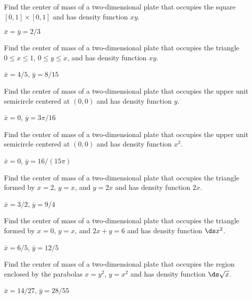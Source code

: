 \begin{enumialphparenastyle}

\begin{ex}
Find the center of mass of a two-dimensional plate 
that occupies the square $[0,1]\times[0,1]$
and has density
function $xy$.
\begin{sol}
$\bar x=\bar y=2/3$
\end{sol}
\end{ex}

\begin{ex}
Find the center of mass of a two-dimensional plate 
that occupies the triangle $0\le x\le1$, $0\le y\le x$,
and has density
function $xy$.
\begin{sol}
$\bar x=4/5$, $\bar y=8/15$
\end{sol}
\end{ex}

\begin{ex}
Find the center of mass of a two-dimensional plate 
that occupies the upper unit semicircle centered at $(0,0)$
and has density
function $y$.
\begin{sol}
$\bar x=0$, $\bar y=3\pi/16$
\end{sol}
\end{ex}

\begin{ex}
Find the center of mass of a two-dimensional plate 
that occupies the upper unit semicircle centered at $(0,0)$
and has density
function $x^2$.
\begin{sol}
$\bar x=0$, $\bar y=16/(15\pi)$
\end{sol}
\end{ex}

\begin{ex}
Find the center of mass of a two-dimensional plate 
that occupies the triangle formed by $x=2$, $y=x$, and $y=2x$
and has density
function $2x$.
\begin{sol}
$\bar x=3/2$, $\bar y=9/4$
\end{sol}
\end{ex}

\begin{ex}
Find the center of mass of a two-dimensional plate 
that occupies the triangle formed by $x=0$, $y=x$, and $2x+y=6$
and has density
function $\ds x^2$.
\begin{sol}
$\bar x=6/5$, $\bar y=12/5$
\end{sol}
\end{ex}

\begin{ex}
Find the center of mass of a two-dimensional plate 
that occupies the region enclosed by the parabolas $x=y^2$, $y=x^2$
and has density
function $\ds\sqrt{x}$.
\begin{sol}
$\bar x=14/27$, $\bar y=28/55$
\end{sol}
\end{ex}


\end{enumialphparenastyle}
